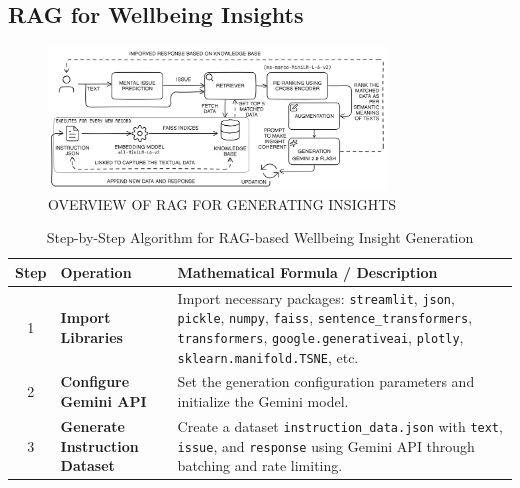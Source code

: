 \subsection{RAG for Wellbeing Insights}

\begin{figure}[H]  
    \centering
    \includegraphics[width=0.8\textwidth]{Images/RAG_FLOW.png}  
    \caption*{OVERVIEW OF RAG FOR GENERATING INSIGHTS}
    \label{01i}  %
\end{figure}

\begin{table}[H]
    \centering
    \caption*{Step-by-Step Algorithm for RAG-based Wellbeing Insight Generation}
    \label{tab:algorithm}
    \begin{tabularx}{\textwidth}{|c|p{2.5cm}|X|}
        \hline
        \textbf{Step} & \textbf{Operation} & \textbf{Mathematical Formula / Description} \\ \hline
        1 & \textbf{Import} \newline \textbf{Libraries} & Import necessary packages: \texttt{streamlit}, \texttt{json}, \texttt{pickle}, \texttt{numpy}, \texttt{faiss}, \texttt{sentence\_transformers}, \texttt{transformers}, \texttt{google.generativeai}, \texttt{plotly}, \texttt{sklearn.manifold.TSNE}, etc. \\ \hline
        2 & \textbf{Configure Gemini API} & Set the generation configuration parameters and initialize the Gemini model. \\ \hline
        3 & \textbf{Generate Instruction Dataset} & Create a dataset \texttt{instruction\_data.json} with \texttt{text}, \texttt{issue}, and \texttt{response} using Gemini API through batching and rate limiting. \\ \hline
    \end{tabularx}
\end{table}

\pagebreak

